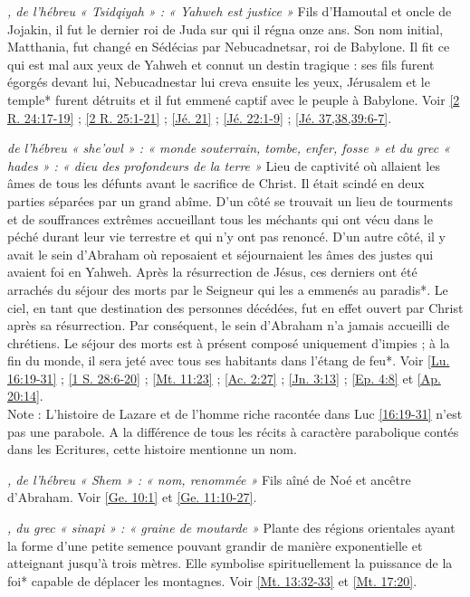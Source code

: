 \begin{multicols}{2}
\textit{, de l'hébreu « Tsidqiyah » : « Yahweh est justice »}\newline
Fils d'Hamoutal et oncle de Jojakin, il fut le dernier roi de Juda sur qui il régna onze ans. Son nom initial, Matthania, fut changé en Sédécias par Nebucadnetsar, roi de Babylone. Il fit ce qui est mal aux yeux de Yahweh et connut un destin tragique : ses fils furent égorgés devant lui, Nebucadnestar lui creva ensuite les yeux, Jérusalem et le temple* furent détruits et il fut emmené captif avec le peuple à Babylone. Voir \vref{2 R. 24:17-19} ; \vref{2 R. 25:1-21} ; \vref{Jé. 21} ; \vref{Jé. 22:1-9} ; \vref{Jé. 37,38,39:6-7}.

\textit{de l'hébreu « she'owl » : « monde souterrain, tombe, enfer, fosse » et du grec « hades » : « dieu des profondeurs de la terre »}\newline
Lieu de captivité où allaient les âmes de tous les défunts avant le sacrifice de Christ. Il était scindé en deux parties séparées par un grand abîme. D'un côté se trouvait un lieu de tourments et de souffrances extrêmes accueillant tous les méchants qui ont vécu dans le péché durant leur vie terrestre et qui n'y ont pas renoncé. D'un autre côté, il y avait le sein d'Abraham où reposaient et séjournaient les âmes des justes qui avaient foi en Yahweh. Après la résurrection de Jésus, ces derniers ont été arrachés du séjour des morts par le Seigneur qui les a emmenés au paradis*. Le ciel, en tant que destination des personnes décédées, fut en effet ouvert par Christ après sa résurrection. Par conséquent, le sein d'Abraham n'a jamais accueilli de chrétiens. Le séjour des morts est à présent composé uniquement d'impies ; à la fin du monde, il sera jeté avec tous ses habitants dans l'étang de feu*. Voir \vref{Lu. 16:19-31} ; \vref{1 S. 28:6-20} ; \vref{Mt. 11:23} ; \vref{Ac. 2:27} ; \vref{Jn. 3:13} ; \vref{Ep. 4:8} et \vref{Ap. 20:14}.
\\Note : L'histoire de Lazare et de l'homme riche racontée dans Luc \vref{16:19-31} n'est pas une parabole. A la différence de tous les récits à caractère parabolique contés dans les Ecritures, cette histoire mentionne un nom.

\textit{, de l'hébreu « Shem » : « nom, renommée »}\newline
Fils aîné de Noé et ancêtre d'Abraham. Voir \vref{Ge. 10:1} et \vref{Ge. 11:10-27}.

\textit{, du grec « sinapi » : « graine de moutarde »}\newline
Plante des régions orientales ayant la forme d'une petite semence pouvant grandir de manière exponentielle et atteignant jusqu'à trois mètres. Elle symbolise spirituellement la puissance de la foi* capable de déplacer les montagnes. Voir \vref{Mt. 13:32-33} et \vref{Mt. 17:20}.


\end{multicols}
